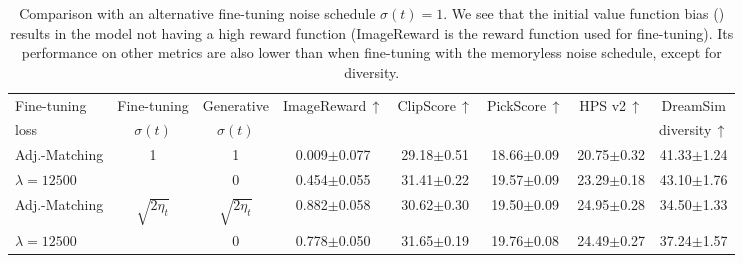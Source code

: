 \begin{table}[h!]
\centering
{\footnotesize
\begin{tabular}{lccccccc}
    \toprule
    Fine-tuning & Fine-tuning & Generative & \multirow{2}{*}{ImageReward$\, \uparrow$} & \multirow{2}{*}{ClipScore$\, \uparrow$} & \multirow{2}{*}{PickScore$\, \uparrow$} & \multirow{2}{*}{HPS v2$\, \uparrow$} & DreamSim \\
    loss & $\sigma(t)$ & $\sigma(t)$ & & &  &  & diversity$\, \uparrow$ \\
    \midrule
    Adj.-Matching  & \multirow{2}{*}{1} & 1 & 0.009{\tiny$\pm$0.077} & 29.18{\tiny$\pm$0.51} & 18.66{\tiny$\pm$0.09} & 20.75{\tiny$\pm$0.32} & 41.33{\tiny$\pm$1.24} \\
    $\lambda = 12500$                     &                                    &  0               & 0.454{\tiny$\pm$0.055} & 31.41{\tiny$\pm$0.22} & 19.57{\tiny$\pm$0.09} & 23.29{\tiny$\pm$0.18} & 43.10{\tiny$\pm$1.76} \\
    \addlinespace
    Adj.-Matching  & \multirow{2}{*}{$\sqrt{2 \eta_t}$} & $\sqrt{2 \eta_t}$ & 0.882{\tiny$\pm$0.058} & 30.62{\tiny$\pm$0.30} & 19.50{\tiny$\pm$0.09} & 24.95{\tiny$\pm$0.28} & 34.50{\tiny$\pm$1.33}  \\
    $\lambda = 12500$                    &                                    & 0                 & 0.778{\tiny$\pm$0.050} & 31.65{\tiny$\pm$0.19} & 19.76{\tiny$\pm$0.08} & 24.49{\tiny$\pm$0.27} & 37.24{\tiny$\pm$1.57}  \\
    \bottomrule
\end{tabular}
}
\caption{Comparison with an alternative fine-tuning noise schedule $\sigma(t)=1$. We see that the initial value function bias () results in the model not having a high reward function (ImageReward is the reward function used for fine-tuning). Its performance on other metrics are also lower than when fine-tuning with the memoryless noise schedule, except for diversity.}
\label{table:alternative_noise_schedule}
\end{table}

